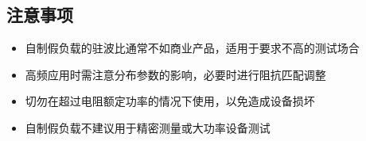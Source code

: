 \subsection{注意事项}

\begin{itemize}
    \item 自制假负载的驻波比通常不如商业产品，适用于要求不高的测试场合
    \item 高频应用时需注意分布参数的影响，必要时进行阻抗匹配调整
    \item 切勿在超过电阻额定功率的情况下使用，以免造成设备损坏
    \item 自制假负载不建议用于精密测量或大功率设备测试
\end{itemize}